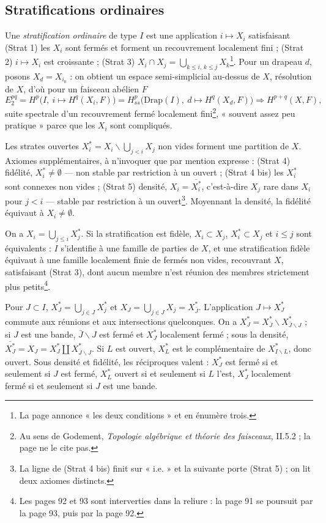 \documentclass[11pt,a4paper]{article}
\begin{document}
\subsection*{Stratifications ordinaires}

Une \emph{stratification ordinaire} de type $I$ est une application $i \mapsto X_i$
satisfaisant (Strat 1) les $X_i$ sont fermés et forment un recouvrement localement
fini ; (Strat 2) $i \mapsto X_i$ est croissante ; (Strat 3) $X_i \cap X_j =
\bigcup_{k \leq i,\, k \leq j} X_k$\footnote{La page annonce « les deux conditions » et
en énumère trois.}. Pour un drapeau $d$, posons $X_d = X_{i_0}$ : on obtient un
espace semi-simplicial au-dessus de $X$, résolution de $X$, d'où pour un faisceau
abélien $F$
\[
E_2^{pq} = H^p\bigl(I,\ i \mapsto H^q(X_i, F)\bigr) = H^p_{ss}\bigl(\mathrm{Drap}(I),\
d \mapsto H^q(X_d, F)\bigr) \Longrightarrow H^{p+q}(X, F),
\]
suite spectrale d'un recouvrement fermé localement fini\footnote{Au sens de
Godement, \emph{Topologie algébrique et théorie des faisceaux}, II.5.2 ; la page ne
le cite pas.}, « souvent assez peu pratique » parce que les $X_i$ sont compliqués.

Les strates ouvertes $X^{*}_i = X_i \smallsetminus \bigcup_{j<i} X_j$ non vides forment
une partition de $X$. Axiomes supplémentaires, à n'invoquer que par mention
expresse : (Strat 4) fidélité, $X^{*}_i \neq \emptyset$ — non stable par restriction à
un ouvert ; (Strat 4 bis) les $X^{*}_i$ sont connexes non vides ; (Strat 5) densité,
$X_i = \overline{X^{*}_i}$, c'est-à-dire $X_j$ rare dans $X_i$ pour $j<i$ — stable
par restriction à un ouvert\footnote{La ligne de (Strat 4 bis) finit sur « i.e. » et
la suivante porte (Strat 5) ; on lit deux axiomes distincts.}. Moyennant la densité,
la fidélité équivaut à $X_i \neq \emptyset$.

On a $X_i = \bigcup_{j \leq i} X^{*}_j$. Si la stratification est fidèle, $X_i \subset
X_j$, $X^{*}_i \subset X_j$ et $i \leq j$ sont équivalents : $I$ s'identifie à une
famille de parties de $X$, et une stratification fidèle équivaut à une famille
localement finie de fermés non vides, recouvrant $X$, satisfaisant (Strat 3), dont
aucun membre n'est réunion des membres strictement plus petits\footnote{Les pages
92 et 93 sont interverties dans la reliure : la page 91 se poursuit par la page 93,
puis par la page 92.}.

Pour $J \subset I$, $X^{*}_J = \bigcup_{j \in J} X^{*}_j$ et $X_J = \bigcup_{j \in J}
X_j = X^{*}_{\bar J}$. L'application $J \mapsto X^{*}_J$ commute aux réunions et aux
intersections quelconques. On a $X^{*}_J = X^{*}_{\bar J} \smallsetminus X^{*}_{\bar J
\smallsetminus J}$ ; si $J$ est une bande, $\bar J \smallsetminus J$ est fermé et $X^{*}_J$
localement fermé ; sous la densité, $\overline{X^{*}_J} = X_J = X^{*}_J \amalg
X^{*}_{\bar J \smallsetminus J}$. Si $L$ est ouvert, $X^{*}_L$ est le complémentaire de
$X^{*}_{I \smallsetminus L}$, donc ouvert. Sous densité et fidélité, les réciproques
valent : $X^{*}_J$ est fermé si et seulement si $J$ est fermé, $X^{*}_L$ ouvert si et
seulement si $L$ l'est, $X^{*}_J$ localement fermé si et seulement si $J$ est une bande.
\end{document}
